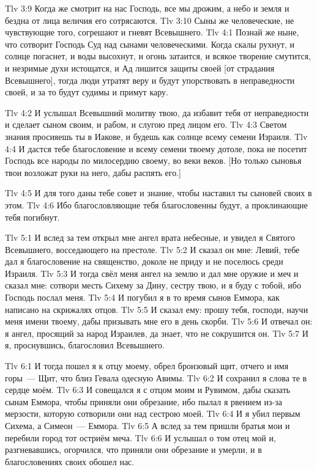 \vs Tlv 3:9
Когда же смотрит на нас Господь,
все мы дрожим, а небо и земля
и бездна от лица величия его сотрясаются.
\vs Tlv 3:10
Сыны же человеческие, не чувствующие того,
согрешают и гневят Всевышнего.
\vs Tlv 4:1
Познай же ныне, что сотворит Господь Суд над сынами человеческими.
Когда скалы рухнут, и солнце погаснет, и воды высохнут,
и огонь затаится, и всякое творение смутится,
и незримые духи истощатся, и Ад лишится защиты своей
[от страдания Всевышнего],
тогда люди утратят веру и будут упорствовать в неправедности своей,
и за то будут судимы и примут кару.

\vs Tlv 4:2
И услышал Всевышний молитву твою, да избавит тебя от неправедности
и сделает сыном своим, и рабом, и слугою пред лицом его.
\vs Tlv 4:3
Светом знания просияешь ты в Иакове,
и будешь как солнце всему семени Израиля.
\vs Tlv 4:4
И дастся тебе благословение и всему семени твоему дотоле,
пока не посетит Господь все народы по милосердию своему,
во веки веков.
[Но только сыновья твои возложат руки на него, дабы распять его.]

\vs Tlv 4:5
И для того даны тебе совет и знание,
чтобы наставил ты сыновей своих в этом.
\vs Tlv 4:6
Ибо благословляющие тебя благословенны будут,
а проклинающие тебя погибнут.

\vs Tlv 5:1
И вслед за тем открыл мне ангел врата небесные,
и увидел я Святого Всевышнего, восседающего на престоле.
\vs Tlv 5:2
И сказал он мне: Левий, тебе дал я благословение на священство,
доколе не приду и не поселюсь среди Израиля.
\vs Tlv 5:3
И тогда свёл меня ангел на землю и дал мне оружие и меч и сказал мне:
сотвори месть Сихему за Дину, сестру твою, и я буду с тобой,
ибо Господь послал меня.
\vs Tlv 5:4
И погубил я в то время сынов Еммора, как написано на скрижалях отцов.
\vs Tlv 5:5
И сказал ему: прошу тебя, господи, научи меня имени твоему,
дабы призывать мне его в день скорби.
\vs Tlv 5:6
И отвечал он: я ангел, просящий за народ Израилев,
да знает, что не сокрушится он.
\vs Tlv 5:7
И я, проснувшись, благословил Всевышнего.

\vs Tlv 6:1
И тогда пошел я к отцу моему, обрел бронзовый щит, отчего и имя
горы~--- Щит, что близ Гевала одесную Авимы.
\vs Tlv 6:2
И сохранил я слова те в сердце моём.
\vs Tlv 6:3
И совещался я с отцом моим и Рувимом, дабы сказать сынам Еммора,
чтобы приняли они обрезание, ибо пылал я рвением из-за мерзости,
которую сотворили они над сестрою моей.
\vs Tlv 6:4
И я убил первым Сихема, а Симеон~--- Еммора.
\vs Tlv 6:5
А вслед за тем пришли братья мои и перебили город тот остриём меча.
\vs Tlv 6:6
И услышал о том отец мой и, разгневавшись, огорчился,
что приняли они обрезание и умерли,
и в благословениях своих обошел нас.

